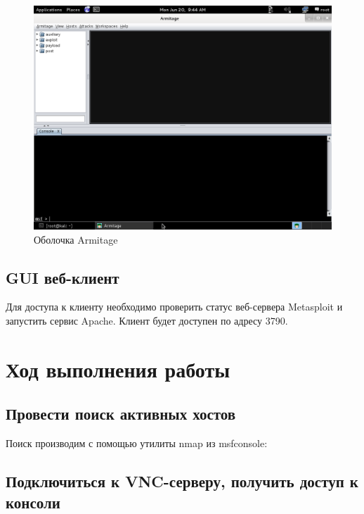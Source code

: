 \documentclass[a4paper]{article}
\begin{document}
\begin{figure}[H]
	\begin{center}
		\includegraphics[scale=0.5]{pics/armitage.png}
		\caption{Оболочка Armitage} 
		\label{pic:pic_name}
	\end{center}
\end{figure}

\subsection{GUI веб-клиент}

Для доступа к клиенту необходимо проверить статус веб-сервера Metasploit и запустить сервис Apache. Клиент будет доступен по адресу 3790.

\section{Ход выполнения работы}

\subsection{Провести поиск активных хостов}

Поиск производим с помощью утилиты nmap из msfconsole:



\subsection{Подключиться к VNC-серверу, получить доступ к консоли}
\end{document}

